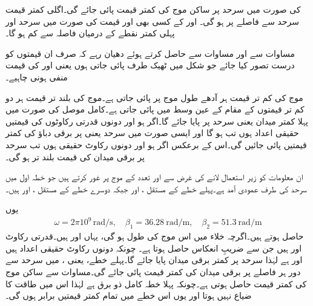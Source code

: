  کی صورت میں سرحد پر ساکن موج کی کمتر قیمت پائی جائے گی۔اگلی کمتر قیمت سرحد سے  فاصلے پر ہو گی۔ اور  کے کسی بھی اور قیمت کی صورت میں سرحد اور پہلی کمتر نقطے کے درمیان فاصلہ  سے کم ہو گا۔

مساوات  سے  اور مساوات  سے  حاصل کرتے ہوئے دھیان رہے کہ صرف ان قیمتوں کو درست تصور کیا جائے جو شکل  میں ٹھیک طرف پائی جاتی ہوں یعنی  اور   کی قیمت منفی ہونی چاہیے۔

موج کی کم تر قیمت ہر آدھے طول موج پر پائی جاتی ہے۔موج کی بلند تر قیمت ہر دو کم تر قیمتوں کے مقام کے عین وسط میں پائی جاتی ہے۔کامل موصل کی صورت میں پہلا کمتر میدان  یعنی سرحد پر پایا جائے گا۔اگر  ہو اور دونوں قدرتی رکاوٹوں کی قیمتیں حقیقی اعداد ہوں تب  ہو گا اور ایسی صورت میں سرحد یعنی  پر برقی دباؤ کی کمتر قیمتیں پائی جائیں گی۔اس کے برعکس اگر  ہو اور دونوں رکاوٹ حقیقی ہوں تب سرحد پر برقی میدان کی قیمت بلند تر ہو گی۔  

ان معلومات کو زیر استعمال لانے کی غرض سے  اور  تعدد کے موج پر غور کرتے ہیں جو خطہ اول میں سرحد کی طرف عمودی آمد ہے۔پہلے خطے کے مستقل ،  اور  جبکہ دوسرے خطے کے مستقل
 ،  اور  ہیں۔

یوں 
\begin{align*}
\omega=2 \pi 10^9 \, \si{\radian \per \second}, \quad \beta_1=\SI{36.28}{\radian \per \meter}, \quad \beta_2=\SI{51.3}{\radian \per \meter}
\end{align*}
حاصل ہوتے ہیں۔اگرچہ خلاء میں اس موج کی طول  ہو گی، یہاں   اور  ہیں۔قدرتی رکاوٹ  اور  ہیں جن سے ضریبِ انعکاس  حاصل ہوتا ہے۔ چونکہ دونوں رکاوٹ حقیقی اعداد ہیں اور  ہے لہٰذا سرحد پر کمتر برقی میدان پایا جائے گا۔پہلے خطے، یعنی  ،  میں سرحد سے دور ہر  فاصلے پر برقی میدان کی کمتر قیمت پائی جائے گی۔مساوات  سے ساکن موج کی کمتر قیمت  حاصل ہوتی ہے۔چونکہ پہلا خطہ کامل ذو برق ہے لہٰذا اس میں طاقت کا ضیاع نہیں ہوتا اور یوں اس خطے میں تمام کمتر قیمتیں برابر ہوں گی۔

